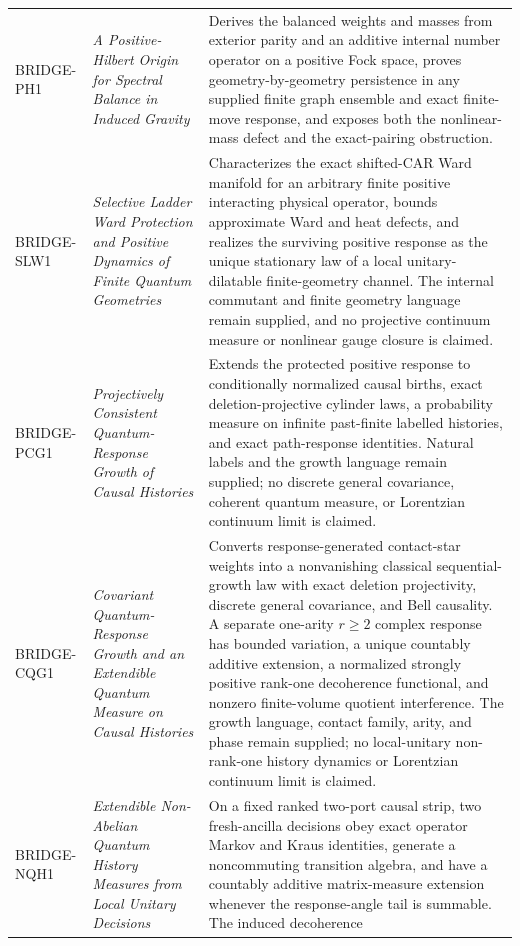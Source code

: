 \begin{longtable}{@{}P{0.10\textwidth}P{0.37\textwidth}P{0.45\textwidth}@{}}
BRIDGE-PH1 & \emph{A Positive-Hilbert Origin for Spectral Balance in
Induced Gravity}
& Derives the balanced weights and masses from exterior parity and an
additive internal number operator on a positive Fock space, proves
geometry-by-geometry persistence in any supplied finite graph ensemble and
exact finite-move response, and exposes both the nonlinear-mass defect and
the exact-pairing obstruction.\\
BRIDGE-SLW1 & \emph{Selective Ladder Ward Protection and Positive Dynamics
of Finite Quantum Geometries}
& Characterizes the exact shifted-CAR Ward manifold for an arbitrary finite
positive interacting physical operator, bounds approximate Ward and heat
defects, and realizes the surviving positive response as the unique
stationary law of a local unitary-dilatable finite-geometry channel.  The
internal commutant and finite geometry language remain supplied, and no
projective continuum measure or nonlinear gauge closure is claimed.\\
BRIDGE-PCG1 & \emph{Projectively Consistent Quantum-Response Growth of
Causal Histories}
& Extends the protected positive response to conditionally normalized
causal births, exact deletion-projective cylinder laws, a probability
measure on infinite past-finite labelled histories, and exact path-response
identities.  Natural labels and the growth language remain supplied; no
discrete general covariance, coherent quantum measure, or Lorentzian
continuum limit is claimed.\\
BRIDGE-CQG1 & \emph{Covariant Quantum-Response Growth and an Extendible
Quantum Measure on Causal Histories}
& Converts response-generated contact-star weights into a nonvanishing
classical sequential-growth law with exact deletion projectivity, discrete
general covariance, and Bell causality.  A separate one-arity \(r\ge2\)
complex response has bounded variation, a unique countably additive
extension, a normalized strongly positive rank-one decoherence functional,
and nonzero finite-volume quotient interference.  The growth language,
contact family, arity, and phase remain supplied; no local-unitary
non-rank-one history dynamics or Lorentzian continuum limit is claimed.\\
\addlinespace
BRIDGE-NQH1 & \emph{Extendible Non-Abelian Quantum History Measures from
Local Unitary Decisions}
& On a fixed ranked two-port causal strip, two fresh-ancilla decisions obey
exact operator Markov and Kraus identities, generate a noncommuting
transition algebra, and have a countably additive matrix-measure extension
whenever the response-angle tail is summable.  The induced decoherence

\end{longtable}
